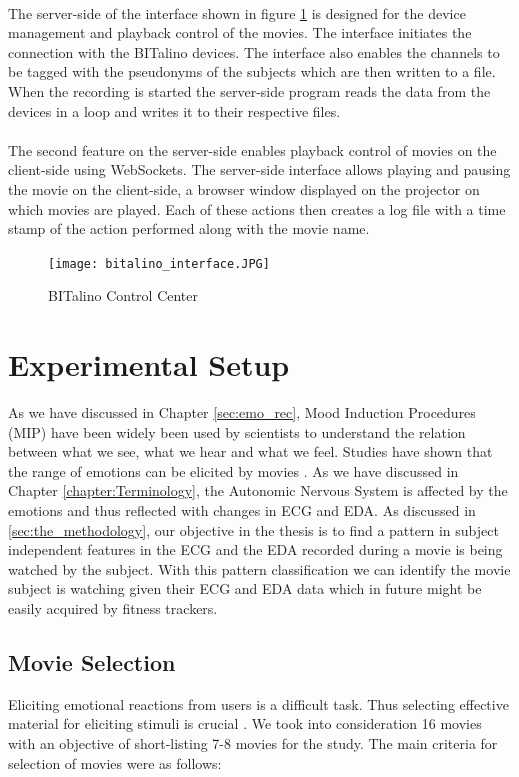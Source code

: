 \paragraph{}
The server-side of the interface shown in figure \ref{fig:bitalino_cc} is designed for the device management and playback control of the movies. The interface initiates the connection with the BITalino devices. The interface also enables the channels to be tagged with the pseudonyms of the subjects which are then written to a file. When the recording is started the server-side program reads the data from the devices in a loop and writes it to their respective files.
\paragraph{}
The second feature on the server-side enables playback control of movies on the client-side using WebSockets. The server-side interface allows playing and pausing the movie on the client-side, a browser window displayed on the projector on which movies are played. Each of these actions then creates a log file with a time stamp of the action performed along with the movie name.
\begin{figure}
\centering
\texttt{[image: bitalino\_interface.JPG]}
\caption{BITalino Control Center}
\label{fig:bitalino_cc}
\end{figure}

\section{Experimental Setup}
As we have discussed in Chapter \ref{sec:emo_rec}, Mood Induction Procedures (MIP) have been widely been used by scientists to understand the relation between what we see, what we hear and what we feel. Studies have shown that the range of emotions can be elicited by movies \cite{gross_emotion_1995}. As we have discussed in Chapter \ref{chapter:Terminology}, the Autonomic Nervous System is affected by the emotions and thus reflected with changes in ECG and EDA. As discussed in \ref{sec:the_methodology}, our objective in the thesis is to find a pattern in subject independent features in the ECG and the EDA recorded during a movie is being watched by the subject. With this pattern classification we can identify the movie subject is watching given their ECG and EDA data which in future might be easily acquired by fitness trackers. 

\subsection{Movie Selection} Eliciting emotional reactions from users is a difficult task. Thus selecting effective material for eliciting stimuli is crucial \cite{koelstra_deap:_2012}. We took into consideration 16 movies with an objective of short-listing 7-8 movies for the study. The main criteria for selection of movies were as follows:


